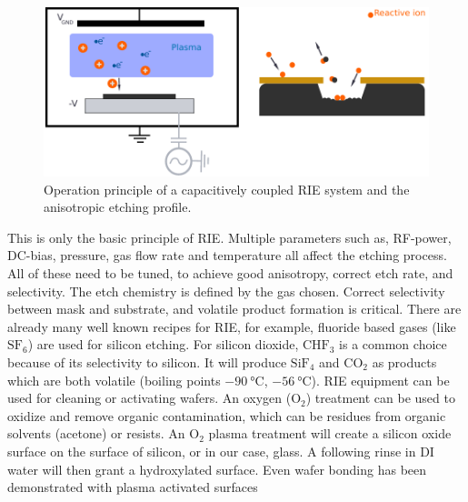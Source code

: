 \documentclass[final]{jyflluk}
\begin{document}
\begin{figure}[h]
    \centering
    \includegraphics[width=1.0\textwidth]{images/RIE.pdf}
    \caption{Operation principle of a capacitively coupled RIE system and the anisotropic etching profile.}
    \label{fig:RIE}
\end{figure}


This is only the basic principle of RIE. Multiple parameters such as, RF-power, DC-bias, pressure, gas flow rate and temperature all affect the etching process. All of these need to be tuned, to achieve good anisotropy, correct etch rate, and selectivity. The etch chemistry is defined by the gas chosen. Correct selectivity between mask and substrate, and volatile product formation is critical. There are already many well known recipes for RIE, for example, fluoride based gases (like $\mathrm{SF_6}$) are used for silicon etching. For silicon dioxide, $\mathrm{CHF_3}$ is a common choice because of its selectivity to silicon. It will produce $\mathrm{SiF_4}$ and $\mathrm{CO_2}$ as products which are both volatile (boiling points $\SI{-90}{\celsius}$, $\SI{-56}{\celsius}$).  \cite{franssila2010introduction}
RIE equipment can be used for cleaning or activating wafers. An oxygen ($\mathrm{O_2}$) treatment can be used to oxidize and remove organic contamination, which can be residues from organic solvents (acetone) or resists. An $\mathrm{O_2}$ plasma treatment will create a silicon oxide surface on the surface of silicon, or in our case, glass. A following rinse in DI water will then grant a hydroxylated surface. Even wafer bonding has been demonstrated with plasma activated surfaces \cite{plach2013mechanisms,poulsen2003towards}
\end{document}
